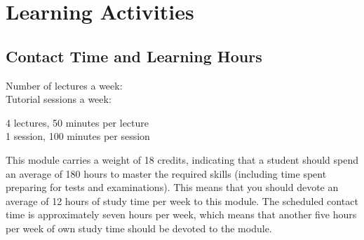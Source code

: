 \section{Learning Activities}
    \subsection{Contact Time and Learning Hours}
        \begin{minipage}{0.4\linewidth}
            Number of lectures a week: \\
            Tutorial sessions a week:
        \end{minipage}
        \begin{minipage}{0.4\linewidth}
            4 lectures, 50 minutes per lecture \\
            1 session, 100 minutes per session
        \end{minipage}

        This module carries a weight of 18 credits, indicating that a student
        should spend an average of 180 hours to master the required skills
        (including time spent preparing for tests and examinations). This means
        that you should devote an average of 12 hours of study time per week to
        this module. The scheduled contact time is approximately seven hours
        per week, which means that another five hours per week of own study
        time should be devoted to the module.

